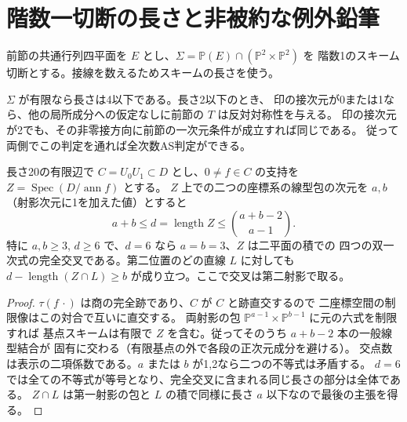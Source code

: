 \section{階数一切断の長さと非被約な例外鉛筆}
\label{sec:finite-marked-secant-pencil}
前節の共通行列四平面を $E$ とし、$\Sigma=\mathbb P(E)\cap(\mathbb P^2\times\mathbb P^2)$ を
階数1のスキーム切断とする。接線を数えるためスキームの長さを使う。
\begin{theorem}\label{thm:finite-marked-secant-pencil}
$\Sigma$ が有限なら長さは4以下である。長さ2以下のとき、
印の接次元が0または1なら、他の局所成分への仮定なしに前節の $T$ は反対対称性を与える。
印の接次元が2でも、その非零接方向に前節の一次元条件が成立すれば同じである。
従って両側でこの判定を通れば全次数AS判定ができる。
\end{theorem}
\begin{lemma}\label{lem:finite-adjacent-word-support}
長さ20の有限辺で $C=U_0U_1\subset D$ とし、$0\ne f\in C$ の支持を
$Z=\operatorname{Spec}(D/\operatorname{ann} f)$ とする。
$Z$ 上での二つの座標系の線型包の次元を $a,b$（射影次元に1を加えた値）とすると
\[
 a+b\le d=\operatorname{length} Z\le\binom{a+b-2}{a-1}.
\]
特に $a,b\ge3$, $d\ge6$ で、$d=6$ なら $a=b=3$、$Z$ は二平面の積での
四つの双一次式の完全交叉である。第二位置のどの直線 $L$ に対しても
$d-\operatorname{length}(Z\cap L)\ge b$ が成り立つ。ここで交叉は第二射影で取る。
\end{lemma}
\begin{proof}
$\tau(f\,\cdot)$ は商の完全跡であり、$C$ が $C$ と跡直交するので
二座標空間の制限像はこの対合で互いに直交する。
両射影の包 $\mathbb P^{a-1}\times\mathbb P^{b-1}$ に元の六式を制限すれば
基点スキームは有限で $Z$ を含む。従ってそのうち $a+b-2$ 本の一般線型結合が
固有に交わる（有限基点の外で各段の正次元成分を避ける）。
交点数は表示の二項係数である。$a$ または $b$ が1,2なら二つの不等式は矛盾する。
$d=6$ では全ての不等式が等号となり、完全交叉に含まれる同じ長さの部分は全体である。
$Z\cap L$ は第一射影の包と $L$ の積で同様に長さ $a$ 以下なので最後の主張を得る。
\end{proof}
